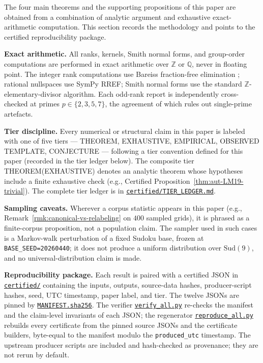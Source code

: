 \documentclass[11pt,a4paper]{article}
\theoremstyle{definition}
\theoremstyle{remark}
\providecommand{\Z}{\mathbb{Z}}
\providecommand{\Q}{\mathbb{Q}}
\begin{document}
The four main theorems and the supporting propositions of this paper
are obtained from a combination of analytic argument and exhaustive
exact-arithmetic computation. This section records the methodology
and points to the certified reproducibility package.

\smallskip
\noindent\textbf{Exact arithmetic.} All ranks, kernels, Smith normal
forms, and group-order computations are performed in exact
arithmetic over $\Z$ or $\Q$, never in floating point. The integer
rank computations use Bareiss fraction-free elimination
\cite{Bareiss68}; rational nullspaces use SymPy RREF; Smith normal
forms use the standard $\Z$-elementary-divisor algorithm. Each
odd-rank report is independently cross-checked at primes $p \in
\{2, 3, 5, 7\}$, the agreement of which rules out single-prime
artefacts.

\smallskip
\noindent\textbf{Tier discipline.} Every numerical or structural
claim in this paper is labeled with one of five tiers --- THEOREM,
EXHAUSTIVE, EMPIRICAL, OBSERVED TEMPLATE, CONJECTURE --- following
a tier convention defined for this paper (recorded in the tier ledger below). The composite tier
THEOREM(EXHAUSTIVE) denotes an analytic theorem whose hypotheses
include a finite exhaustive check (e.g.,
Certified Proposition~\ref{thm:aut-LM19-trivial}). The complete tier ledger is in
\href{../certified/TIER_LEDGER.md}{\texttt{certified/TIER\_LEDGER.md}}.

\smallskip
\noindent\textbf{Sampling caveats.} Wherever a corpus statistic
appears in this paper (e.g.,
Remark~\ref{rmk:canonical-vs-relabeling} on $400$ sampled grids), it
is phrased as a finite-corpus proposition, not a population claim.
The sampler used in such cases is a Markov-walk perturbation of a
fixed Sudoku base, frozen at \texttt{BASE\_SEED=20260440}; it does
not produce a uniform distribution over $\mathrm{Sud}(9)$, and no
universal-distribution claim is made.

\smallskip
\noindent\textbf{Reproducibility package.} Each result is paired
with a certified JSON in
\href{../certified/}{\texttt{certified/}} containing
the inputs, outputs, source-data hashes, producer-script hashes,
seed, UTC timestamp, paper label, and tier. The twelve JSONs are
pinned by
\href{../certified/MANIFEST.sha256}{\texttt{MANIFEST.sha256}}.
The verifier
\href{../certified/verify_all.py}{\texttt{verify\_all.py}}
re-checks the manifest and the claim-level invariants of each JSON;
the regenerator
\href{../certified/reproduce_all.py}{\texttt{reproduce\_all.py}}
rebuilds every certificate from the pinned source JSONs and the
certificate builders, byte-equal to the manifest modulo the
\texttt{produced\_utc} timestamp.  The upstream producer scripts are
included and hash-checked as provenance; they are not rerun by default.
\end{document}
